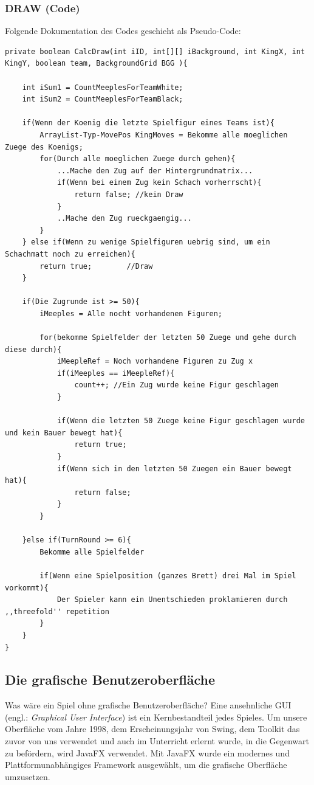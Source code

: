 \documentclass[12pt,a4paper]{article}
\begin{document}
 \subsubsection{DRAW (Code)}
 \label{SUBSUBSEC:DRAW-CODE}

Folgende Dokumentation des Codes geschieht als Pseudo-Code:

\textbf{\lstset{language=Java}}
\begin{lstlisting}
private boolean CalcDraw(int iID, int[][] iBackground, int KingX, int KingY, boolean team, BackgroundGrid BGG ){
	
	int iSum1 = CountMeeplesForTeamWhite;
	int iSum2 = CountMeeplesForTeamBlack;
	
	if(Wenn der Koenig die letzte Spielfigur eines Teams ist){
		ArrayList-Typ-MovePos KingMoves = Bekomme alle moeglichen Zuege des Koenigs;
		for(Durch alle moeglichen Zuege durch gehen){ 
			...Mache den Zug auf der Hintergrundmatrix...
			if(Wenn bei einem Zug kein Schach vorherrscht){
				return false; //kein Draw
			}		
			..Mache den Zug rueckgaengig...
		}		
	} else if(Wenn zu wenige Spielfiguren uebrig sind, um ein Schachmatt noch zu erreichen){
		return true;		//Draw
	}
	
	if(Die Zugrunde ist >= 50){
		iMeeples = Alle nocht vorhandenen Figuren;
		
		for(bekomme Spielfelder der letzten 50 Zuege und gehe durch diese durch){
			iMeepleRef = Noch vorhandene Figuren zu Zug x
			if(iMeeples == iMeepleRef){
				count++; //Ein Zug wurde keine Figur geschlagen
			}
			
			if(Wenn die letzten 50 Zuege keine Figur geschlagen wurde und kein Bauer bewegt hat){
				return true;
			}
			if(Wenn sich in den letzten 50 Zuegen ein Bauer bewegt hat){
				return false;
			}
		}
		
	}else if(TurnRound >= 6){
		Bekomme alle Spielfelder 	
	
		if(Wenn eine Spielposition (ganzes Brett) drei Mal im Spiel vorkommt){
			Der Spieler kann ein Unentschieden proklamieren durch ,,threefold'' repetition
		}
	}
}
\end{lstlisting}



\newpage
\subsection{Die grafische Benutzeroberfläche}
Was wäre ein Spiel ohne grafische Benutzeroberfläche? Eine ansehnliche GUI (engl.: \textit{Graphical User Interface}) ist ein Kernbestandteil jedes Spieles. Um unsere Oberfläche vom Jahre 1998, dem Erscheinungsjahr von Swing, dem Toolkit das zuvor von uns verwendet und auch im Unterricht erlernt wurde, in die Gegenwart zu befördern, wird JavaFX verwendet. Mit JavaFX wurde ein modernes und Plattformunabhängiges Framework ausgewählt, um die grafische Oberfläche umzusetzen.
\end{document}
